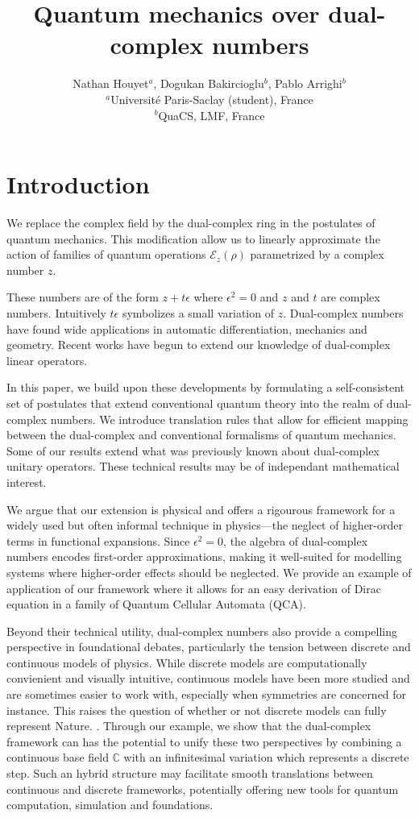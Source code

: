 \documentclass{article}
\title{Quantum mechanics over dual-complex numbers}
\author{Nathan Houyet$^{a}$, Dogukan Bakircioglu$^{b}$, Pablo Arrighi$^{b}$ \\
        \small $^{a}$Université Paris-Saclay (student), France \\
        \small $^{b}$QuaCS, LMF, France \\
}
\date{}
\newcommand{\C}{\mathbb{C}}
\newcommand{\e}{\epsilon}
\newcommand{\E}{\mathcal{E}}
\begin{document}
\maketitle

\section{Introduction}

We replace the complex field by the dual-complex ring in the postulates of quantum mechanics. This modification allow us to linearly approximate the action of families of quantum operations $\E_z(\rho)$ parametrized by a complex number $z$.

These numbers are of the form $z + t \e$ where $\e^2 = 0$ and $z$ and $t$ are complex numbers. Intuitively $t\e$ symbolizes a small variation of $z$. Dual-complex numbers have found wide applications in automatic differentiation, mechanics and geometry. \cite{brodsky2000, baydin2018, yang1963, rev2016} Recent works have begun to extend our knowledge of dual-complex linear operators. \cite{qi2024, liu2025}

In this paper, we build upon these developments by formulating a self-consistent set of postulates that extend conventional quantum theory into the realm of dual-complex numbers. We introduce translation rules that allow for efficient mapping between the dual-complex and conventional formalisms of quantum mechanics. Some of our results extend what was previously known about dual-complex unitary operators. These technical results may be of independant mathematical interest.

We argue that our extension is physical and offers a rigourous framework for a widely used but often informal technique in physics—the neglect of higher-order terms in functional expansions. Since $\e^2=0$, the algebra of dual-complex numbers encodes first-order approximations, making it well-suited for modelling systems where higher-order effects should be neglected. We provide an example of application of our framework where it allows for an easy derivation of Dirac equation in a family of Quantum Cellular Automata (QCA).

Beyond their technical utility, dual-complex numbers also provide a compelling perspective in foundational debates, particularly the tension between discrete and continuous models of physics. While discrete models are computationally convienient and visually intuitive, continuous models have been more studied and are sometimes easier to work with, especially when symmetries are concerned for instance. This raises the question of whether or not discrete models can fully represent Nature. \cite{kornyak2013, hossenfelder2012, stecker2011, chamseddine2014, chamseddine2017}.
Through our example, we show that the dual-complex framework can has the potential to unify these two perspectives by combining a continuous base field $\C$ with an infinitesimal variation which represents a discrete step. Such an hybrid structure may facilitate smooth translations between continuous and discrete frameworks, potentially offering new tools for quantum computation, simulation and foundations.
\end{document}

